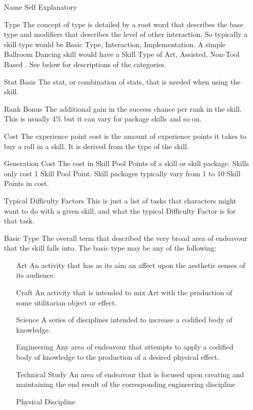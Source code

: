 \begin{itemize}
	\item[Name] Self Explanatory
	\item[Type] The concept of type is detailed by a root word that describes the base
	type and modifiers that describes the level of other interaction. So
	typically a skill type would be Basic Type, Interaction, Implementation.
	A simple Ballroom Dancing skill would have a Skill Type of
	Art, Assisted, Non-Tool Based . See below for descriptions of the
	categories.
	\item[Stat Basis] The stat, or combination of stats, that is needed
	when using the skill.
	\item[Rank Bonus] The additional gain in the success chance per rank
	in the skill. This is usually 4\% but it can vary for package skills
	and so on.
	\item[Cost]	The experience point cost is the amount of experience points it takes to
	buy a roll in a skill. It is derived from the type of the skill.
	\item[Generation Cost]
	The cost in Skill Pool Points of a skill or skill package. Skills
	only cost 1 Skill Pool Point. Skill packages typically vary from 1
	to 10 Skill Points in cost.
	\item[Typical Difficulty Factors]
	This is just a list of tasks that characters might want to do with a
	given skill, and what the typical Difficulty Factor is for that task.
	\item[Basic Type]
	The overall term that described the very broad area of
	endeavour that the skill falls into. The basic type may be any of the
	following:
	\begin{itemize}
		\item[Art]
		An activity that has as its aim an affect upon the aesthetic senses of its
		audience.
		\item[Craft]
		An activity that is intended to mix Art with the production of some
		utilitarian object or effect.
		\item[Science]
		A series of disciplines intended to increase a codified body of
		knowledge.
		\item[Engineering]
		Any area of endeavour that attempts to apply a codified body of
		knowledge to the production of a desired physical effect.
		\item[Technical Study]
		An area of endeavour that is focused upon creating and maintaining the
		end result of the corresponding engineering discipline
		\item[Physical Discipline]

\end{itemize}
\end{itemize}
